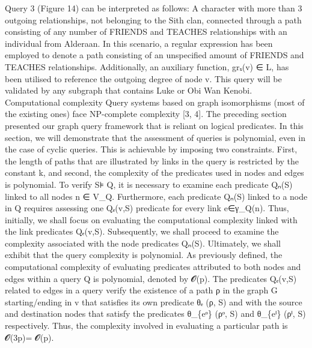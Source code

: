 \documentclass{article}%
\begin{document}
\newline%
Query 3 (Figure 14) can be interpreted as follows: A character with more than 3 outgoing relationships, not belonging to the Sith clan, connected through a path consisting of any number of FRIENDS and TEACHES relationships with an individual from Alderaan. In this scenario, a regular expression has been employed to denote a path consisting of an unspecified amount of FRIENDS and TEACHES relationships. Additionally, an auxiliary function, grₛ(v) ∈ L, has been utilised to reference the outgoing degree of node v. This query will be validated by any subgraph that contains Luke or Obi Wan Kenobi.\newline%
\newline%
Computational complexity\newline%
\newline%
Query systems based on graph isomorphisms (most of the existing ones) face NP{-}complete complexity {[}3, 4{]}.\newline%
\newline%
The preceding section presented our graph query framework that is reliant on logical predicates. In this section, we will demonstrate that the assessment of queries is polynomial, even in the case of cyclic queries. This is achievable by imposing two constraints. First, the length of paths that are illustrated by links in the query is restricted by the constant k, and second, the complexity of the predicates used in nodes and edges is polynomial.\newline%
\newline%
To verify S⊧ Q, it is necessary to examine each predicate Qₙ(S) linked to all nodes n ∈ V\_Q. Furthermore, each predicate Qₙ(S) linked to a node in Q requires assessing one Qₑ(v,S) predicate for every link e∈γ\_Q(n). Thus, initially, we shall focus on evaluating the computational complexity linked with the link predicates Qₑ(v,S). Subsequently, we shall proceed to examine the complexity associated with the node predicates Qₙ(S). Ultimately, we shall exhibit that the query complexity is polynomial.\newline%
\newline%
As previously defined, the computational complexity of evaluating predicates attributed to both nodes and edges within a query Q is polynomial, denoted by 𝓞(p). The predicates Qₑ(v,S) related to edges in a query verify the existence of a path ρ in the graph G starting/ending in v that satisfies its own predicate θₑ (ρ, S) and with the source and destination nodes that satisfy the predicates θ\_\{eᵒ\} (ρᵒ, S) and θ\_\{eⁱ\} (ρⁱ, S) respectively. Thus, the complexity involved in evaluating a particular path is 𝓞(3p)= 𝓞(p).\newline%
\end{document}
